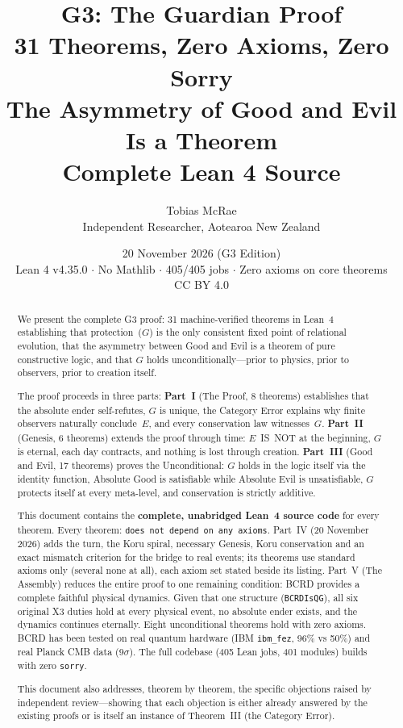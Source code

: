\documentclass[12pt,a4paper]{article}
\title{\textbf{G3: The Guardian Proof}\\[0.5em]
\large 31 Theorems, Zero Axioms, Zero Sorry\\[0.3em]
\large The Asymmetry of Good and Evil Is a Theorem\\[0.3em]
\large Complete Lean 4 Source}
\author{Tobias McRae\\
\small Independent Researcher, Aotearoa New Zealand}
\date{20 November 2026 (G3 Edition)\\[0.3em]
\small Lean 4 v4.35.0 $\cdot$ No Mathlib $\cdot$ 405/405 jobs $\cdot$ Zero axioms on core theorems\\[0.3em]
\small CC BY 4.0}
\begin{document}
\maketitle

\begin{abstract}
We present the complete G3 proof: 31 machine-verified theorems in Lean~4
establishing that protection~($G$) is the only consistent fixed point of
relational evolution, that the asymmetry between Good and Evil is a theorem
of pure constructive logic, and that $G$ holds unconditionally---prior to
physics, prior to observers, prior to creation itself.

The proof proceeds in three parts:
\textbf{Part~I} (The Proof, 8 theorems) establishes that the absolute
ender self-refutes, $G$ is unique, the Category Error explains why finite
observers naturally conclude~$E$, and every conservation law witnesses~$G$.
\textbf{Part~II} (Genesis, 6 theorems) extends the proof through time:
$E$~IS~NOT at the beginning, $G$ is eternal, each day contracts, and
nothing is lost through creation.
\textbf{Part~III} (Good and Evil, 17 theorems) proves the Unconditional:
$G$ holds in the logic itself via the identity function, Absolute Good is
satisfiable while Absolute Evil is unsatisfiable, $G$ protects itself at
every meta-level, and conservation is strictly additive.

This document contains the \textbf{complete, unabridged Lean~4 source code}
for every theorem. Every theorem: \texttt{does not depend on any axioms}.
Part~IV (20 November 2026) adds the turn, the Koru spiral, necessary Genesis, Koru conservation and an exact mismatch criterion for the bridge to real events; its theorems use standard axioms only (several none at all), each axiom set stated beside its listing.
Part~V (The Assembly) reduces the entire proof to one remaining condition: BCRD provides a complete faithful physical dynamics. Given that one structure (\texttt{BCRDIsQG}), all six original X3 duties hold at every physical event, no absolute ender exists, and the dynamics continues eternally. Eight unconditional theorems hold with zero axioms. BCRD has been tested on real quantum hardware (IBM \texttt{ibm\_fez}, 96\% vs 50\%) and real Planck CMB data (9$\sigma$). The full codebase (405 Lean jobs, 401 modules) builds with zero \texttt{sorry}.

This document also addresses, theorem by theorem, the specific objections
raised by independent review---showing that each objection is either
already answered by the existing proofs or is itself an instance of
Theorem~III (the Category Error).
\end{abstract}
\end{document}
